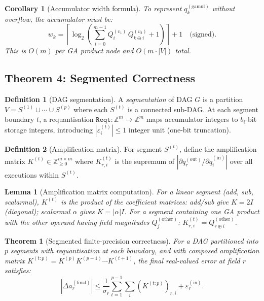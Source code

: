 \documentclass[11pt,a4paper]{article}
\theoremstyle{definition}
\newtheorem{definition}{Definition}[section]
\theoremstyle{plain}
\newtheorem{theorem}{Theorem}[section]
\newtheorem{lemma}{Lemma}[section]
\newtheorem{corollary}{Corollary}[section]
\theoremstyle{remark}
\begin{document}
\begin{corollary}[Accumulator width formula]
\label{cor:accum}
To represent $q_k^{(\mathrm{gamul})}$ without overflow, the accumulator
must be:
\begin{equation}\label{eq:accum-width}
  w_k = \left\lceil \log_2\!\left(
    \sum_{i=0}^{m-1} Q_i^{(v_1)}\,Q_{k\oplus i}^{(v_2)} + 1
  \right)\right\rceil + 1 \quad\text{(signed).}
\end{equation}
This is $O(m)$ per GA product node and $O(m \cdot |V|)$ total.
\end{corollary}

\subsection{Theorem 4: Segmented Correctness}
\label{sec:segmented}

\begin{definition}[DAG segmentation]
A \emph{segmentation} of DAG $G$ is a partition
$V = S^{(1)} \cup \cdots \cup S^{(p)}$ where each $S^{(t)}$ is a
connected sub-DAG.
At each segment boundary $t$, a requantisation
$\mathtt{Reqt}: \mathbb{Z}^m \to \mathbb{Z}^m$ maps accumulator
integers to $b_i$-bit storage integers, introducing
$|\varepsilon_i^{(t)}| \le 1$ integer unit (one-bit truncation).
\end{definition}

\begin{definition}[Amplification matrix]
For segment $S^{(t)}$, define the amplification matrix
$K^{(t)} \in \mathbb{Z}_{\ge 0}^{m \times m}$ where
$K^{(t)}_{r,i}$ is the supremum of
$|\partial q_r^{(\mathrm{out})} / \partial q_i^{(\mathrm{in})}|$
over all executions within $S^{(t)}$.
\end{definition}

\begin{lemma}[Amplification matrix computation]
\label{lem:amp}
For a linear segment (add, sub, scalarmul), $K^{(t)}$ is the product
of the coefficient matrices:
add/sub give $K = 2I$ (diagonal); scalarmul $\alpha$ gives
$K = |\alpha|I$.
For a segment containing one GA product with the other operand having
field magnitudes $Q_j^{(\mathrm{other})}$:
$K^{(t)}_{r,i} = Q_{r \oplus i}^{(\mathrm{other})}$.
\end{lemma}

\begin{theorem}[Segmented finite-precision correctness]
\label{thm:segmented}
For a DAG partitioned into $p$ segments with requantisation at each
boundary, and with composed amplification matrix
$K^{(t:p)} = K^{(p)} K^{(p-1)} \cdots K^{(t+1)}$, the final
real-valued error at field $r$ satisfies:
\begin{equation}\label{eq:segmented-real}
  |\Delta a_r^{(\mathrm{final})}|
  \le \frac{1}{\sigma_r}\sum_{t=1}^{p-1}\sum_i (K^{(t:p)})_{r,i}
  + \varepsilon_r^{(\mathrm{in})}.
\end{equation}
\end{theorem}
\end{document}
